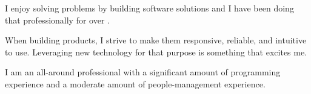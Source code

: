 

\begin{cvparagraph}
I enjoy solving problems by building software solutions and I have been doing that professionally for over .

When building products, I strive to make them responsive, reliable, and intuitive to use. Leveraging new technology for that purpose is something that excites me.

I am an all-around professional with a significant amount of programming experience and a moderate amount of people-management experience.
\end{cvparagraph}
